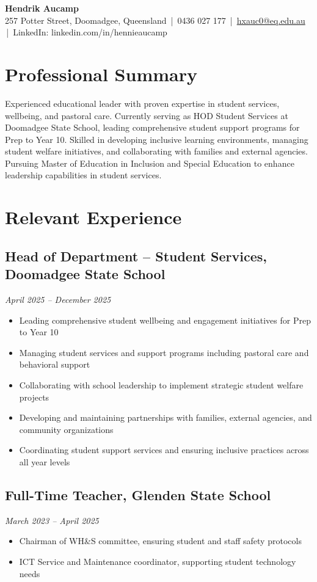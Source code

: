 \documentclass[11pt,a4paper]{article}
\newcommand{\contact}[5]{
    \begin{center}
        {\Huge \textbf{#1}} \\[8pt]
        #2 \,|\, #3 \,|\, \href{mailto:#4}{#4} \,|\, #5
    \end{center}
    \vspace{0.5cm}
}
\begin{document}
\contact{Hendrik Aucamp}
{257 Potter Street, Doomadgee, Queensland}
{0436 027 177}
{hxauc0@eq.edu.au}
{LinkedIn: linkedin.com/in/hennieaucamp}

\section*{Professional Summary}
Experienced educational leader with proven expertise in student services, wellbeing, and pastoral care. Currently serving as HOD Student Services at Doomadgee State School, leading comprehensive student support programs for Prep to Year 10. Skilled in developing inclusive learning environments, managing student welfare initiatives, and collaborating with families and external agencies. Pursuing Master of Education in Inclusion and Special Education to enhance leadership capabilities in student services.

\section*{Relevant Experience}

\subsection*{Head of Department – Student Services, Doomadgee State School}
\textit{April 2025 – December 2025}
\begin{itemize}
    \item Leading comprehensive student wellbeing and engagement initiatives for Prep to Year 10
    \item Managing student services and support programs including pastoral care and behavioral support
    \item Collaborating with school leadership to implement strategic student welfare projects
    \item Developing and maintaining partnerships with families, external agencies, and community organizations
    \item Coordinating student support services and ensuring inclusive practices across all year levels
\end{itemize}

\subsection*{Full-Time Teacher, Glenden State School}
\textit{March 2023 – April 2025}
\begin{itemize}
    \item Chairman of WH\&S committee, ensuring student and staff safety protocols
    \item ICT Service and Maintenance coordinator, supporting student technology needs
\end{itemize}
\end{document}
